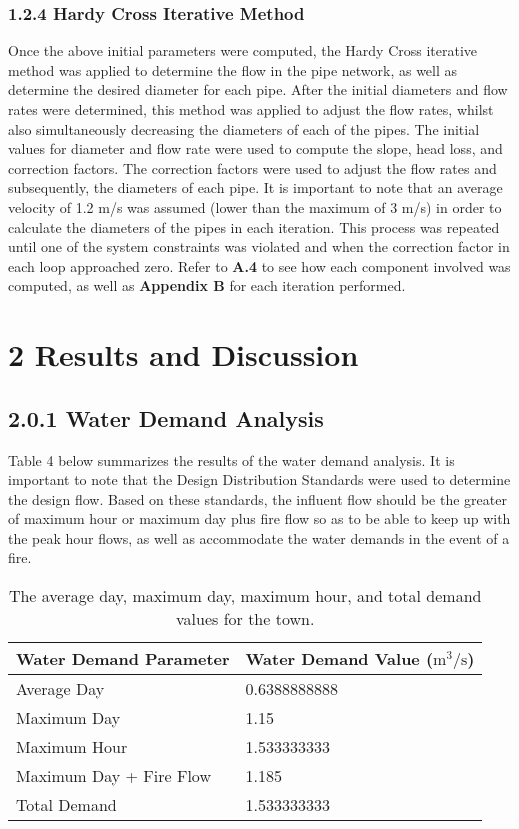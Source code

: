 \documentclass[]{article}
\begin{document}
\subsubsection{1.2.4 Hardy Cross Iterative Method} 
\noindent Once the above initial parameters were computed, the Hardy Cross iterative method was applied to determine the flow in the pipe network, as well as determine the desired diameter for each pipe. After the initial diameters and flow rates were determined, this method was applied to adjust the flow rates, whilst also simultaneously decreasing the diameters of each of the pipes. The initial values for diameter and flow rate were used to compute the slope, head loss, and correction factors. The correction factors were used to adjust the flow rates and subsequently, the diameters of each pipe. It is important to note that an average velocity of 1.2 m/s was assumed (lower than the maximum of 3 m/s) in order to calculate the diameters of the pipes in each iteration. This process was repeated until one of the system constraints was violated and when the correction factor in each loop approached zero. Refer to \textbf{A.4} to see how each component involved was computed, as well as \textbf{Appendix B} for each iteration performed.  

\section{2 Results and Discussion}
\subsection{2.0.1 Water Demand Analysis}
\noindent Table 4 below summarizes the results of the water demand analysis. It is important to note that the Design Distribution Standards were used to determine the design flow. Based on these standards, the influent flow should be the greater of maximum hour or maximum day plus fire flow so as to be able to keep up with the peak hour flows, as well as accommodate the water demands in the event of a fire.    
\begin{table}[H]
	\centering
	\begin{tabular}{|M{5cm}|M{5cm}|}
		\hline
		 Water Demand Parameter &  Water Demand Value ($\text{m}^3/\text{s}$) \\ \hline
		Average Day  &  0.6388888888 \\ \hline
		Maximum Day & 1.15 \\ \hline
		Maximum Hour & 1.533333333  \\ \hline
		Maximum Day + Fire Flow & 1.185 \\ \hline
		 Total Demand &  1.533333333 \\ \hline
	\end{tabular}
	\caption[Water Demand Analysis Results]{The average day, maximum day, maximum hour, and total demand values for the town.}
\end{table}
\end{document}
